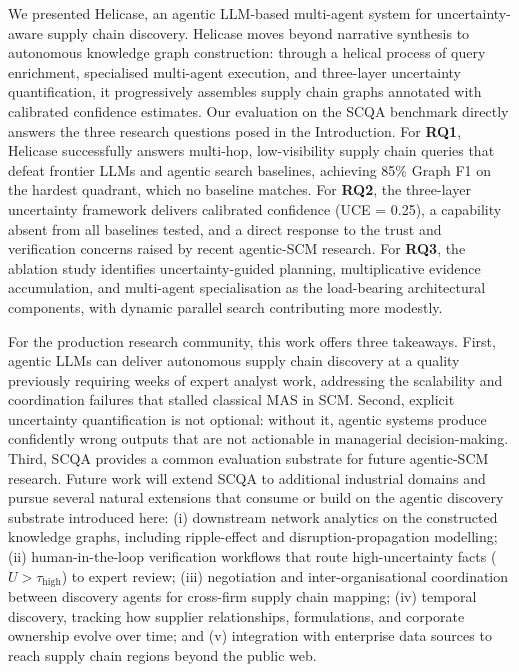 \documentclass{article}
\begin{document}
We presented Helicase, an agentic LLM-based multi-agent system for uncertainty-aware supply chain discovery. Helicase moves beyond narrative synthesis to autonomous knowledge graph construction: through a helical process of query enrichment, specialised multi-agent execution, and three-layer uncertainty quantification, it progressively assembles supply chain graphs annotated with calibrated confidence estimates.
Our evaluation on the SCQA benchmark directly answers the three research questions posed in the Introduction. For \textbf{RQ1}, Helicase successfully answers multi-hop, low-visibility supply chain queries that defeat frontier LLMs and agentic search baselines, achieving 85\% Graph F1 on the hardest quadrant, which no baseline matches. For \textbf{RQ2}, the three-layer uncertainty framework delivers calibrated confidence (UCE = 0.25), a capability absent from all baselines tested, and a direct response to the trust and verification concerns raised by recent agentic-SCM research. For \textbf{RQ3}, the ablation study identifies uncertainty-guided planning, multiplicative evidence accumulation, and multi-agent specialisation as the load-bearing architectural components, with dynamic parallel search contributing more modestly.

For the production research community, this work offers three takeaways. First, agentic LLMs can deliver autonomous supply chain discovery at a quality previously requiring weeks of expert analyst work, addressing the scalability and coordination failures that stalled classical MAS in SCM. Second, explicit uncertainty quantification is not optional: without it, agentic systems produce confidently wrong outputs that are not actionable in managerial decision-making. Third, SCQA provides a common evaluation substrate for future agentic-SCM research. Future work will extend SCQA to additional industrial domains and pursue several natural extensions that consume or build on the agentic discovery substrate introduced here: (i) downstream network analytics on the constructed knowledge graphs, including ripple-effect and disruption-propagation modelling; (ii) human-in-the-loop verification workflows that route high-uncertainty facts ($U > \tau_{\text{high}}$) to expert review; (iii) negotiation and inter-organisational coordination between discovery agents for cross-firm supply chain mapping; (iv) temporal discovery, tracking how supplier relationships, formulations, and corporate ownership evolve over time; and (v) integration with enterprise data sources to reach supply chain regions beyond the public web.
\end{document}
